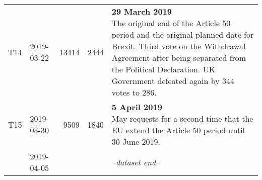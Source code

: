 \begin{table}[htp]
\begin{tabular}{clrrp{\mywidth}}
		T14 & 2019-03-22 & 13414 & 2444 & \makecell[t{p{\mywidth}}]{
			\textbf{29 March 2019}\\
			The original end of the Article 50 period and the original planned date for Brexit. Third vote on the Withdrawal Agreement after being separated from the Political Declaration. UK Government defeated again by 344 votes to 286.} \\
	
		T15 & 2019-03-30 & 9509 & 1840 & \makecell[t{p{\mywidth}}]{
			\textbf{5 April 2019}\\
			May requests for a second time that the EU extend the Article 50 period until 30 June 2019.} \\

		& 2019-04-05 &  &  & \textit{--dataset end--} \\ \bottomrule
	\end{tabular}

\end{table}
